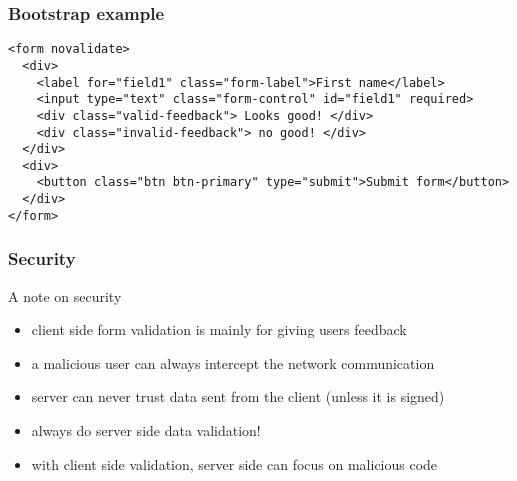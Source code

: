 \begin{frame}[fragile] \frametitle{Bootstrap example}
\begin{lstlisting}[style=htmlcssjs]
<form novalidate>
  <div>
    <label for="field1" class="form-label">First name</label>
    <input type="text" class="form-control" id="field1" required>
    <div class="valid-feedback"> Looks good! </div>
    <div class="invalid-feedback"> no good! </div>
  </div>
  <div>
    <button class="btn btn-primary" type="submit">Submit form</button>
  </div>
</form>
\end{lstlisting}
\end{frame}
\begin{frame}[fragile] \frametitle{Security}
A note on security
\begin{itemize}
  \item client side form validation is mainly for giving users feedback
  \item a malicious user can always intercept the network communication
  \item server can never trust data sent from the client (unless it is signed)
  \item always do server side data validation!
  \item with client side validation, server side can focus on malicious code
\end{itemize}
\end{frame}

